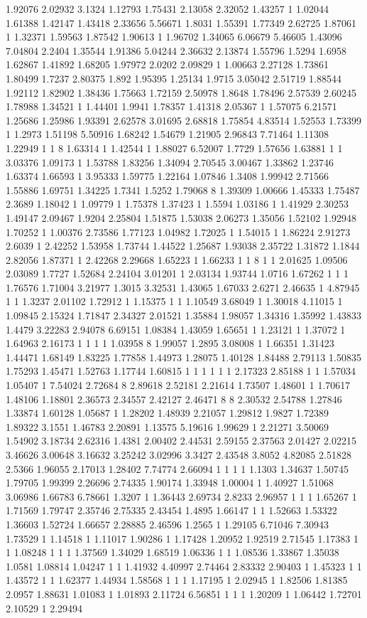 1.92076 2.02932 3.1324 1.12793 1.75431 2.13058 2.32052 1.43257 1 1.02044 1.61388 1.42147 1.43418 2.33656 5.56671 1.8031 1.55391 1.77349 2.62725 1.87061 1 1.32371 1.59563 1.87542 1.90613 1 1.96702 1.34065 6.06679 5.46605 1.43096 7.04804 2.2404 1.35544 1.91386 5.04244 2.36632 2.13874 1.55796 1.5294 1.6958 1.62867 1.41892 1.68205 1.97972 2.0202 2.09829 1 1.00663 2.27128 1.73861 1.80499 1.7237 2.80375 1.892 1.95395 1.25134 1.9715 3.05042 2.51719 1.88544 1.92112 1.82902 1.38436 1.75663 1.72159 2.50978 1.8648 1.78496 2.57539 2.60245 1.78988 1.34521 1 1.44401 1.9941 1.78357 1.41318 2.05367 1 1.57075 6.21571 1.25686 1.25986 1.93391 2.62578 3.01695 2.68818 1.75854 4.83514 1.52553 1.73399 1 1.2973 1.51198 5.50916 1.68242 1.54679 1.21905 2.96843 7.71464 1.11308 1.22949 1 1 8 1.63314 1 1.42544 1 1.88027 6.52007 1.7729 1.57656 1.63881 1 1 3.03376 1.09173 1 1.53788 1.83256 1.34094 2.70545 3.00467 1.33862 1.23746 1.63374 1.66593 1 3.95333 1.59775 1.22164 1.07846 1.3408 1.99942 2.71566 1.55886 1.69751 1.34225 1.7341 1.5252 1.79068 8 1.39309 1.00666 1.45333 1.75487 2.3689 1.18042 1 1.09779 1 1.75378 1.37423 1 1.5594 1.03186 1 1.41929 2.30253 1.49147 2.09467 1.9204 2.25804 1.51875 1.53038 2.06273 1.35056 1.52102 1.92948 1.70252 1 1.00376 2.73586 1.77123 1.04982 1.72025 1 1.54015 1 1.86224 2.91273 2.6039 1 2.42252 1.53958 1.73744 1.44522 1.25687 1.93038 2.35722 1.31872 1.1844 2.82056 1.87371 1 2.42268 2.29668 1.65223 1 1.66233 1 1 8 1 1 2.01625 1.09506 2.03089 1.7727 1.52684 2.24104 3.01201 1 2.03134 1.93744 1.0716 1.67262 1 1 1 1.76576 1.71004 3.21977 1.3015 3.32531 1.43065 1.67033 2.6271 2.46635 1 4.87945 1 1 1.3237 2.01102 1.72912 1 1.15375 1 1 1.10549 3.68049 1 1.30018 4.11015 1 1.09845 2.15324 1.71847 2.34327 2.01521 1.35884 1.98057 1.34316 1.35992 1.43833 1.4479 3.22283 2.94078 6.69151 1.08384 1.43059 1.65651 1 1.23121 1 1.37072 1 1.64963 2.16173 1 1 1 1 1.03958 8 1.99057 1.2895 3.08008 1 1.66351 1.31423 1.44471 1.68149 1.83225 1.77858 1.44973 1.28075 1.40128 1.84488 2.79113 1.50835 1.75293 1.45471 1.52763 1.17744 1.60815 1 1 1 1 1 1 2.17323 2.85188 1 1 1.57034 1.05407 1 7.54024 2.72684 8 2.89618 2.52181 2.21614 1.73507 1.48601 1 1.70617 1.48106 1.18801 2.36573 2.34557 2.42127 2.46471 8 8 2.30532 2.54788 1.27846 1.33874 1.60128 1.05687 1 1.28202 1.48939 2.21057 1.29812 1.9827 1.72389 1.89322 3.1551 1.46783 2.20891 1.13575 5.19616 1.99629 1 2.21271 3.50069 1.54902 3.18734 2.62316 1.4381 2.00402 2.44531 2.59155 2.37563 2.01427 2.02215 3.46626 3.00648 3.16632 3.25242 3.02996 3.3427 2.43548 3.8052 4.82085 2.51828 2.5366 1.96055 2.17013 1.28402 7.74774 2.66094 1 1 1 1 1.1303 1.34637 1.50745 1.79705 1.99399 2.26696 2.74335 1.90174 1.33948 1.00004 1 1.40927 1.51068 3.06986 1.66783 6.78661 1.3207 1 1.36443 2.69734 2.8233 2.96957 1 1 1 1.65267 1 1.71569 1.79747 2.35746 2.75335 2.43454 1.4895 1.66147 1 1 1.52663 1.53322 1.36603 1.52724 1.66657 2.28885 2.46596 1.2565 1 1.29105 6.71046 7.30943 1.73529 1 1.14518 1 1.11017 1.90286 1 1.17428 1.20952 1.92519 2.71545 1.17383 1 1 1.08248 1 1 1 1.37569 1.34029 1.68519 1.06336 1 1 1.08536 1.33867 1.35038 1.0581 1.08814 1.04247 1 1 1.41932 4.40997 2.74464 2.83332 2.90403 1 1.45323 1 1 1.43572 1 1 1.62377 1.44934 1.58568 1 1 1 1.17195 1 2.02945 1 1.82506 1.81385 2.0957 1.88631 1.01083 1 1.01893 2.11724 6.56851 1 1 1 1.20209 1 1.06442 1.72701 2.10529 1 2.29494 